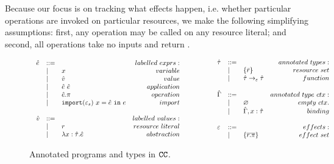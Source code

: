 Because our focus is on tracking what effects happen, i.e. whether
particular operations are invoked on particular resources, we make the
following simplifying assumptions: first, any operation may be called on any
resource literal; and second, all operations take no inputs and return .

\begin{figure}[hbt]
\vspace*{-5mm}
\[
\begin{array}{lll}
\begin{array}{lllr}
\hat e & ::= & ~ & labelled~exprs: \\
	& | & x & variable \\
	& | & \hat v & value \\
	& | & \hat e ~ \hat e & application \\
	& | & \hat e.\pi & operation \\
	& | & \mathtt{import}(\varepsilon_s)~x = \hat e~\mathtt{in}~e & import \\
	&&\\

\hat v & ::= & ~ & labelled~values: \\
	& | & r & resource~literal\\
	& | & \lambda x: \hat \tau.\hat e & abstraction \\
\end{array}
& ~~~~~~~~&
\begin{array}{lllr}

\hat \tau & ::= & ~ & annotated ~types: \\
		& | & \{ \bar r \} & resource~set\\
		& | & \hat \tau \rightarrow_{\varepsilon} \hat \tau & function \\
		&&\\

\hat \Gamma & ::= & ~ & annotated~type~ctx:\\
				& | & \varnothing & empty~ctx.\\
				& | & \hat \Gamma, x: \hat \tau & binding \\
				&&\\

\varepsilon & ::= & ~ & effects: \\
		& | & \{ \overline{r.\pi} \} & effect~set \\
\end{array}
\end{array}
\]
\vspace*{-5mm}
\caption{Annotated programs and types in $\mathtt{CC}$.}
\vspace*{-5mm}
\label{fig:epscalc_annotated_grammar}
\end{figure}

